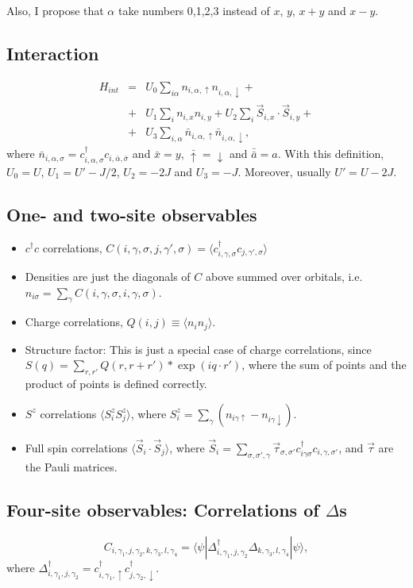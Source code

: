 \documentclass[twocolumn,showpacs,preprintnumbers,amsmath,amssymb,prb]{revtex4}
\begin{document}
Also, I propose that $\alpha$  take numbers 0,1,2,3 instead of $x$, $y$, $x+y$ and $x-y$.

\subsection{Interaction}
\begin{align}
H_{int} & = & U_0 \sum_{i\alpha} n_{i,\alpha,\uparrow}
n_{i,\alpha,\downarrow}+\nonumber\\
& + & U_1\sum_{i} n_{i,x} n_{i,y} +  
U_2\sum_{i} \vec{S}_{i,x}\cdot \vec{S}_{i,y}+\nonumber\\
& +  & U_3\sum_{i,\alpha} \bar{n}_{i,\alpha,\uparrow}\bar{n}_{i,\alpha,\downarrow},
\end{align}
where $\bar{n}_{i,\alpha,\sigma}=c^\dagger_{i,\alpha,\sigma}
c_{i,\bar{\alpha},\bar{\sigma}}$ and $\bar{x}=y$, $\bar{\uparrow}=\downarrow$
and $\bar{\bar{a}}=a$.
With this definition, $U_0=U$, $U_1=U'-J/2$, $U_2= -2J$ and
$U_3= -J$. Moreover, usually $U'=U-2J$. 

\subsection{One- and two-site observables}
\begin{itemize}
\item $c^\dagger c$ correlations, $C(i,\gamma,\sigma,j,\gamma',\sigma)=\langle c^\dagger_{i,\gamma,\sigma} c_{j,\gamma',\sigma}\rangle$
\item Densities are just the diagonals of $C$ above summed over orbitals, i.e.
$n_{i\sigma} = \sum_\gamma C(i,\gamma,\sigma,i,\gamma,\sigma)$.
\item Charge correlations, $Q(i,j)\equiv\langle n_{i} n_{j} \rangle$.
\item Structure factor: This is just a special case of charge correlations, since
$S(q)=\sum_{r,r'} Q(r,r+r')*\exp(i q \cdot r')$, where the sum of points and the product of points
is defined correctly.
\item $S^z$ correlations $\langle S^z_i S^z_j\rangle$, where $S^z_i=\sum_{\gamma} (n_{i\gamma\uparrow}-n_{i\gamma\downarrow})$.
\item Full spin correlations $\langle \vec{S}_i\cdot \vec{S}_j\rangle$,
where $\vec{S}_i = \sum_{\sigma,\sigma',\gamma} \vec{\tau}_{\sigma,\sigma'}c^\dagger_{i\gamma\sigma} c_{i,\gamma,\sigma'}$,
and $\vec{\tau}$ are the Pauli matrices.
\end{itemize}
 
\subsection{Four-site observables: Correlations of $\Delta$s}
\begin{equation}
C_{i,\gamma_1,j,\gamma_2,k,\gamma_3,l,\gamma_4} = 
\langle\psi| \Delta^\dagger_{i,\gamma_1,j,\gamma_2} \Delta_{k,\gamma_3,l,\gamma_4}|\psi\rangle,
\end{equation}
where $\Delta^\dagger_{i,\gamma_1,j,\gamma_2}=c^\dagger_{i,\gamma_1,\uparrow}c^\dagger_{j,\gamma_2,\downarrow}$.
\end{document}
